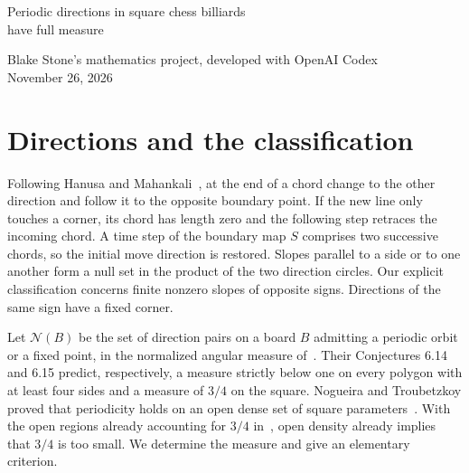 \documentclass[11pt]{article}
\begin{document}
\begin{center}
{\LARGE Periodic directions in square chess billiards\\[3pt]have full measure}\par\medskip
Blake Stone's mathematics project, developed with OpenAI Codex\\November 26, 2026
\end{center}
\begin{abstract}
A point moves across a square along chords of two prescribed directions in alternation. We prove that almost every pair of directions gives a periodic trajectory. The conclusion holds on every parallelogram. This refutes the two measure predictions of Hanusa and Mahankali. For slopes $a,-b$ of unequal positive magnitudes we give a continued-fraction test for periodicity. The exceptional parameters on each fixed slope-ratio ray have Hausdorff dimension strictly below one. The example with slopes $1/3,-1/4$ has dense boundary trajectories and exact unfolded vertical drift $1-1/\sqrt2$. The proof reduces the square to a piecewise affine circle map and establishes the measure result by uniform distortion of explicit inverse branches.
\end{abstract}

\section{Directions and the classification}
Following Hanusa and Mahankali~\cite{hm}, at the end of a chord change to the other direction and follow it to the opposite boundary point. If the new line only touches a corner, its chord has length zero and the following step retraces the incoming chord. A time step of the boundary map $S$ comprises two successive chords, so the initial move direction is restored. Slopes parallel to a side or to one another form a null set in the product of the two direction circles. Our explicit classification concerns finite nonzero slopes of opposite signs. Directions of the same sign have a fixed corner.

Let $\mathcal N(B)$ be the set of direction pairs on a board $B$ admitting a periodic orbit or a fixed point, in the normalized angular measure of~\cite[\S6.4]{hm}. Their Conjectures 6.14 and 6.15 predict, respectively, a measure strictly below one on every polygon with at least four sides and a measure of $3/4$ on the square. Nogueira and Troubetzkoy proved that periodicity holds on an open dense set of square parameters~\cite[Theorem~13]{nt}. With the open regions already accounting for $3/4$ in~\cite[Theorem~6.13]{hm}, open density already implies that $3/4$ is too small. We determine the measure and give an elementary criterion.
\end{document}
